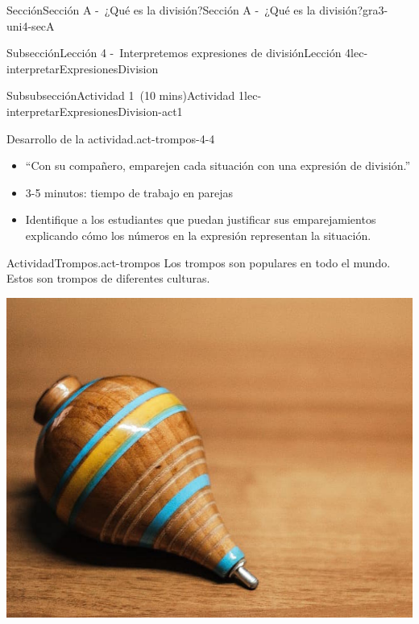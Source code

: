 \documentclass[oneside,10pt,]{article}
\begin{document}
\begin{sectionptx}{Sección}{Sección A -~¿Qué es la división?}{}{Sección A -~¿Qué es la división?}{}{}{gra3-uni4-secA}
\begin{subsectionptx}{Subsección}{Lección 4 -~Interpretemos expresiones de división}{}{Lección 4}{}{}{lec-interpretarExpresionesDivision}
\begin{subsubsectionptx}{Subsubsección}{Actividad 1~(10 mins)}{}{Actividad 1}{}{}{lec-interpretarExpresionesDivision-act1}
\begin{paragraphs}{Desarrollo de la actividad.}{act-trompos-4-4}%
%
\begin{itemize}[label=\textbullet]
\item{}``Con su compañero, emparejen cada situación con una expresión de división.''%
\item{}3-5 minutos: tiempo de trabajo en parejas%
\item{}Identifique a los estudiantes que puedan justificar sus emparejamientos explicando cómo los números en la expresión representan la situación.%
\end{itemize}
\end{paragraphs}%
\begin{activity}{Actividad}{Trompos.}{act-trompos}%
Los trompos son populares en todo el mundo. Estos son trompos de diferentes culturas.%
\begin{sidebyside}{5}{0}{0}{0}%
\begin{sbspanel}{0.2}%
\includegraphics[width=\linewidth]{external/jpg-source/V1 3.4.A.4 Mexican Trompo.jpg}
\end{sbspanel}%
\begin{sbspanel}{0.2}%

\end{sbspanel}
\end{sidebyside}
\end{activity}
\end{subsubsectionptx}
\end{subsectionptx}
\end{sectionptx}
\end{document}
